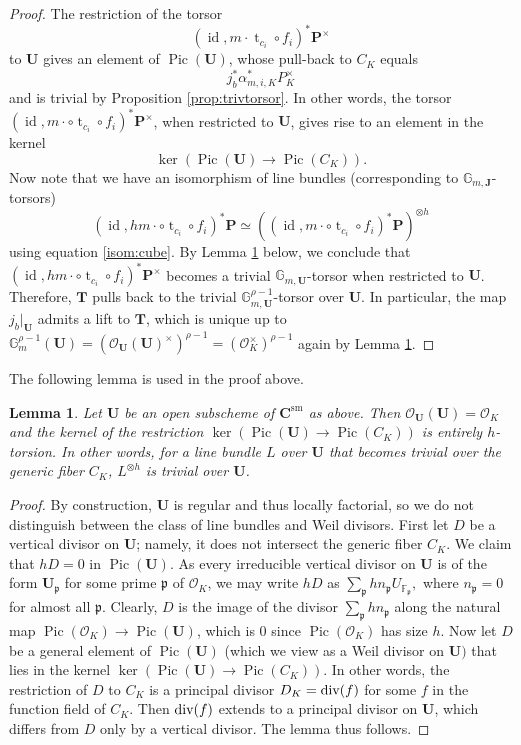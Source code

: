 \documentclass[11pt,oneside]{amsart}
\theoremstyle{plain}
\newtheorem{lemma}[theorem]{Lemma}
\theoremstyle{definition}
\def\lra{{\longrightarrow}}
\def\G{{\bf G}}
\DeclareMathOperator{\sm}{sm}
\DeclareMathOperator{\Pic}{Pic}
\DeclareMathOperator{\id}{id} \DeclareMathOperator{\Sel}{Sel}
\DeclareMathOperator{\tr}{t}
\def\TT{\mathbf{T}}
\def\F{\mathbb{F}}
\def\J{\mathbf{J}}
\def\G{\mathbb{G}}
\def\P{\mathbf{P}}
\def\CC{\mathbf{C}}
\def\ra{\rightarrow}
\def\U{\mathbf{U}}
\def\oh{\mathcal{O}}
\begin{document}
\begin{proof}
The restriction of the torsor
$$(\id, m\cdot \tr_{c_i} \circ f_i)^* \P^\times$$ to $\U$ gives an element of $\Pic(\U)$, whose pull-back to $C_K$ equals 
$$j_{b}^*\alpha_{m, i, K}^*P_K^{\times}$$ and is trivial by Proposition \ref{prop:trivtorsor}. In other words, the torsor $(\id, m\cdot \circ \tr_{c_i} \circ f_i)^* \P^\times$, when restricted to $\U$, gives rise to an element in the kernel 
$$\ker (\Pic (\U) \lra \Pic (C_K)).$$
Now note that we have an isomorphism of line bundles (corresponding to $\G_{m, \J}$-torsors)  
\begin{equation}
    (\id, hm\cdot \circ \tr_{c_i} \circ f_i)^*\P  \simeq ((\id, m\cdot \circ \tr_{c_i} \circ f_i)^* \P)^{\otimes h}
\end{equation}
using equation \ref{isom:cube}. By Lemma \ref{lem:PicU} below, we conclude that $(\id, hm\cdot \circ \tr_{c_i} \circ f_i)^* \P^\times$ becomes a trivial $\G_{m, \U}$-torsor when restricted to $\U$. Therefore, $\TT$ pulls back to the trivial $\G_{m, \U}^{\rho-1}$-torsor over $\U$. In particular, the map $j_b\vert_{\U}$ admits a lift to $\TT$, which is unique up to $\G_m^{\rho-1}(\U)=(\oh_\U(\U)^\times)^{\rho-1}=(\oh_K^{\times})^{\rho-1}$ again by Lemma \ref{lem:PicU}. 
\end{proof}
 
The following lemma is used in the proof above. 

\begin{lemma}\label{lem:PicU}
Let $\U$ be an open subscheme of $\CC^{\sm}$ as above. Then $\oh_{\U}(\U)=\oh_K$ and the kernel of the restriction $\ker(\Pic(\U)\lra  \Pic(C_K))$ is entirely $h$-torsion. In other words, for a line bundle $L$ over $\U$ that becomes trivial over the generic fiber $C_K$, $L^{\otimes h}$ is trivial over $\U$. 
\end{lemma}

\begin{proof}
By construction, $\U$ is regular and thus locally factorial, so we do not distinguish between the class of line bundles and Weil divisors.  First let $D$ be a vertical divisor on $\U$; namely, it does not intersect the generic fiber $C_K$. We claim that $h D = 0$ in $\Pic (\U)$. As every irreducible vertical divisor on $\U$ is of the form $\U_\mathfrak{p}$ for some prime $\mathfrak{p}$ of $\oh_K$, we may write $h D$ as 
$\sum_{\mathfrak{p}} h n_\mathfrak{p} U_{\F_\mathfrak{p}},$ where $n_{\mathfrak{p}}=0$ for almost all $\mathfrak{p}$. Clearly, $D$ is the image of the divisor $\sum_{\mathfrak{p}} h n_{\mathfrak p}$ along the natural map $\Pic (\oh_K) \ra \Pic (\U)$, which is $0$ since $\Pic (\oh_K)$ has size $h$. Now let $D$ be a general element of $\Pic(\U)$ (which we view as a Weil divisor on $\U)$ that lies in the kernel $\ker (\Pic (\U) \rightarrow \Pic (C_K))$. In other words, the restriction of $D$ to $C_K$ is a principal divisor $D_K = \textup{div} (f)$ for some $f$ in the function field of $C_K$. Then $\textup{div} (f)$ extends to a principal divisor on $\U$, which differs from $D$ only by a vertical divisor. The lemma thus follows.  
\end{proof}
\end{document}
